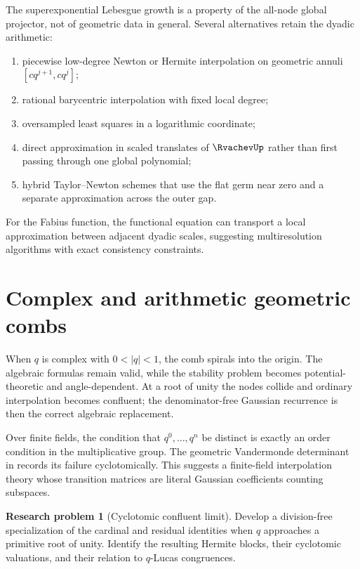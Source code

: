\documentclass[11pt,oneside]{book}
\numberwithin{equation}{chapter}
\theoremstyle{definition}
\newtheorem{problem}[theorem]{Research problem}
\theoremstyle{remark}
\begin{document}
The superexponential Lebesgue growth is a property of the all-node global
projector, not of geometric data in general.  Several alternatives retain
the dyadic arithmetic:
\begin{enumerate}
\item piecewise low-degree Newton or Hermite interpolation on geometric
      annuli $[cq^{j+1},cq^j]$;
\item rational barycentric interpolation with fixed local degree;
\item oversampled least squares in a logarithmic coordinate;
\item direct approximation in scaled translates of $\RvachevUp$ rather than first
      passing through one global polynomial;
\item hybrid Taylor--Newton schemes that use the flat germ near zero and a
      separate approximation across the outer gap.
\end{enumerate}
For the Fabius function, the functional equation can transport a local
approximation between adjacent dyadic scales, suggesting multiresolution
algorithms with exact consistency constraints.

\section{Complex and arithmetic geometric combs}

When $q$ is complex with $0<|q|<1$, the comb spirals into the origin.  The
algebraic formulas remain valid, while the stability problem becomes
potential-theoretic and angle-dependent.  At a root of unity the nodes
collide and ordinary interpolation becomes confluent; the denominator-free
Gaussian recurrence is then the correct algebraic replacement.

Over finite fields, the condition that $q^0,\ldots,q^n$ be distinct is
exactly an order condition in the multiplicative group.  The geometric
Vandermonde determinant in  records its
failure cyclotomically.  This suggests a finite-field interpolation theory
whose transition matrices are literal Gaussian coefficients counting
subspaces.

\begin{problem}[Cyclotomic confluent limit]
\label{prob:cyclotomic-confluent-limit}
Develop a division-free specialization of the cardinal and residual
identities when $q$ approaches a primitive root of unity.  Identify the
resulting Hermite blocks, their cyclotomic valuations, and their relation to
$q$-Lucas congruences.
\end{problem}
\end{document}
